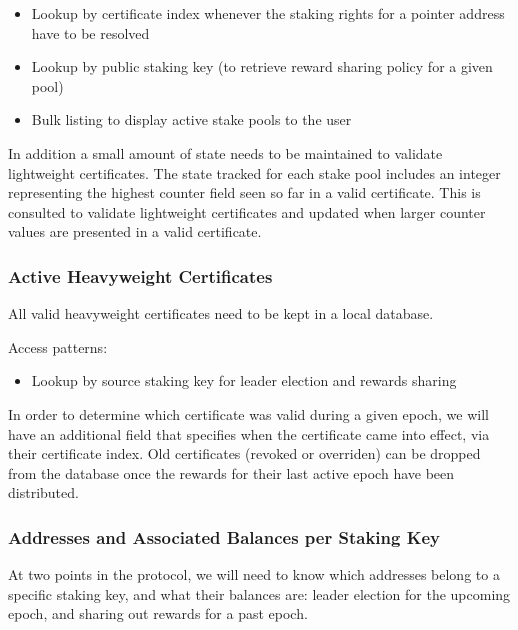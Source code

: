 \documentclass[11pt,a4paper]{article}
\begin{document}
\begin{itemize}
\item
  Lookup by certificate index whenever the staking rights for a pointer
  address have to be resolved
\item
  Lookup by public staking key (to retrieve reward sharing policy for a
  given pool)
\item
  Bulk listing to display active stake pools to the user
\end{itemize}

In addition a small amount of state needs to be maintained to validate
lightweight certificates. The state tracked for each stake pool includes
an integer representing the highest counter field seen so far in a valid
certificate. This is consulted to validate lightweight certificates and
updated when larger counter values are presented in a valid certificate.

\subsubsection{Active Heavyweight
Certificates}\label{active-heavyweight-certificates}

All valid heavyweight certificates need to be kept in a local database.

Access patterns:

\begin{itemize}
\item
  Lookup by source staking key for leader election and rewards sharing
\end{itemize}

In order to determine which certificate was valid during a given epoch,
we will have an additional field that specifies when the certificate
came into effect, via their certificate index. Old certificates (revoked
or overriden) can be dropped from the database once the rewards for
their last active epoch have been distributed.

\subsubsection{Addresses and Associated Balances per Staking
Key}\label{addresses-and-associated-balances-per-staking-key}


At two points in the protocol, we will need to know which addresses
belong to a specific staking key, and what their balances are: leader
election for the upcoming epoch, and sharing out rewards for a past
epoch.
\end{document}
